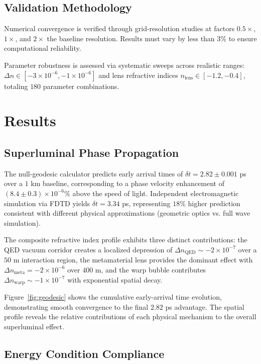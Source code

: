 \documentclass[aps,prl,reprint,groupedaddress]{revtex4-1}
\begin{document}
\subsection{Validation Methodology}

Numerical convergence is verified through grid-resolution studies at factors $0.5\times$, $1\times$, and $2\times$ the baseline resolution. Results must vary by less than $3\%$ to ensure computational reliability.

Parameter robustness is assessed via systematic sweeps across realistic ranges: $\Delta n \in [-3 \times 10^{-6}, -1 \times 10^{-6}]$ and lens refractive indices $n_{\text{lens}} \in [-1.2, -0.4]$, totaling $180$ parameter combinations.

\section{Results}

\subsection{Superluminal Phase Propagation}

The null-geodesic calculator predicts early arrival times of $\delta t = 2.82 \pm 0.001$ ps over a $1$ km baseline, corresponding to a phase velocity enhancement of $(8.4 \pm 0.3) \times 10^{-6} \%$ above the speed of light. Independent electromagnetic simulation via FDTD yields $\delta t = 3.34$ ps, representing $18\%$ higher prediction consistent with different physical approximations (geometric optics vs. full wave simulation).

The composite refractive index profile exhibits three distinct contributions: the QED vacuum corridor creates a localized depression of $\Delta n_{\text{QED}} \sim -2 \times 10^{-7}$ over a $50$ m interaction region, the metamaterial lens provides the dominant effect with $\Delta n_{\text{meta}} = -2 \times 10^{-6}$ over $400$ m, and the warp bubble contributes $\Delta n_{\text{warp}} \sim -1 \times 10^{-7}$ with exponential spatial decay.

Figure~\ref{fig:geodesic} shows the cumulative early-arrival time evolution, demonstrating smooth convergence to the final $2.82$ ps advantage. The spatial profile reveals the relative contributions of each physical mechanism to the overall superluminal effect.

\subsection{Energy Condition Compliance}
\end{document}
